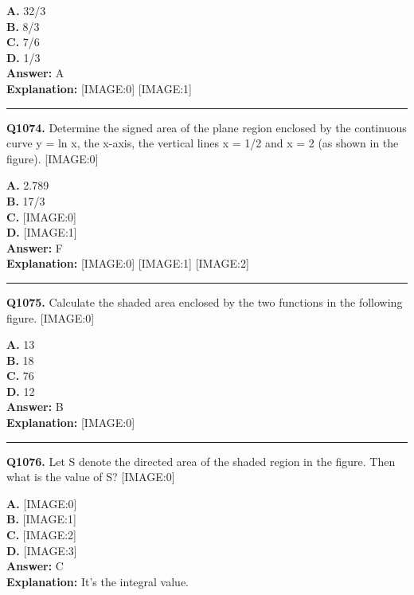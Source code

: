 \documentclass[12pt]{article}
\begin{document}
\textbf{A.} 32/3 \\
\textbf{B.} 8/3 \\
\textbf{C.} 7/6 \\
\textbf{D.} 1/3 \\

\textbf{Answer:} A \\
\textbf{Explanation:} [IMAGE:0]
[IMAGE:1]

\hrule
\vspace{1em}


\noindent
\textbf{Q1074.} Determine the signed area of the plane region enclosed by the continuous curve y = ln x, the x-axis, the vertical lines x = 1/2 and x = 2 (as shown in the figure).
[IMAGE:0]



\textbf{A.} 2.789 \\
\textbf{B.} 17/3 \\
\textbf{C.} [IMAGE:0] \\
\textbf{D.} [IMAGE:1] \\

\textbf{Answer:} F \\
\textbf{Explanation:} [IMAGE:0]
[IMAGE:1]
[IMAGE:2]

\hrule
\vspace{1em}


\noindent
\textbf{Q1075.} Calculate the shaded area enclosed by the two functions in the following figure.
[IMAGE:0]



\textbf{A.} 13 \\
\textbf{B.} 18 \\
\textbf{C.} 76 \\
\textbf{D.} 12 \\

\textbf{Answer:} B \\
\textbf{Explanation:} [IMAGE:0]

\hrule
\vspace{1em}


\noindent
\textbf{Q1076.} Let S denote the directed area of the shaded region in the figure. Then what is the value of S?
[IMAGE:0]



\textbf{A.} [IMAGE:0] \\
\textbf{B.} [IMAGE:1] \\
\textbf{C.} [IMAGE:2] \\
\textbf{D.} [IMAGE:3] \\

\textbf{Answer:} C \\
\textbf{Explanation:} It's the integral value.
\end{document}
